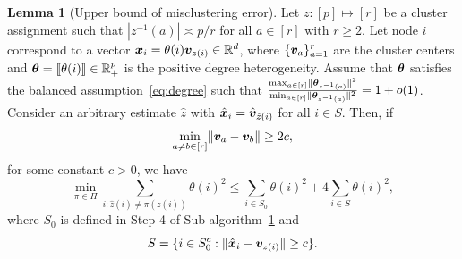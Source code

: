 \documentclass[journal]{IEEEtran}
\theoremstyle{definition}
\newtheorem{lem}{Lemma}
\theoremstyle{definition}
\begin{document}
\begin{lem}[Upper bound of misclustering error]\label{lem:upper_mis} Let $z: [p] \mapsto [r]$ be a cluster assignment such that $|z^{-1}(a)| \asymp p/r$ for all $a \in [r]$ {with $r \geq 2$}. Let node $i$ correspond to a vector $\bm x_i  = \theta(i) \bm{v}_{z(i)} \in \mathbb{R}^d$, where $\{\bm{v}_a\}_{a = 1}^r$ are the cluster centers and $\boldsymbol{\theta} = \llbracket \theta(i) \rrbracket \in \mathbb{R}^p_+$ is the positive degree heterogeneity.  Assume that  $\boldsymbol{\theta}$ satisfies the balanced assumption~\eqref{eq:degree} such that ${\max_{a \in [r]} \lVert\boldsymbol{\theta}_{z^{-1}(a)}\rVert^2 \over \min_{a \in [r]} \lVert\boldsymbol{\theta}_{z^{-1}(a)}\rVert^2 }= 1 + o(1)$. Consider an arbitrary estimate $\hat z$ with $\hat {\bm x}_i = \hat {\bm{v}}_{\hat z(i)}$ for all $ i \in S$. Then, if
\begin{equation}\label{eq:upper_mis_cond}
    \min_{a \neq b \in [r]} \onormSize{}{\mv_a - \mv_b} \geq 2c,
\end{equation}
 for some constant $c >0$, we have 
\begin{equation}
    \min_{\pi \in \Pi} \sum_{i : \hat z(i) \neq \pi(z(i))} \theta(i)^2 \leq \sum_{i \in S_0} \theta(i)^2 + 4 \sum_{i \in S} \theta(i)^2,
\end{equation}
where $S_0$ is defined in {Step 4} of Sub-algorithm~\hyperref[alg:main]{1} and
\begin{equation}
   S = \{i \in S_0^c: \lVert\hat {\bm x}_i - \bm{v}_{z(i)} \rVert \geq c \}.
\end{equation}

\end{lem}
\end{document}

